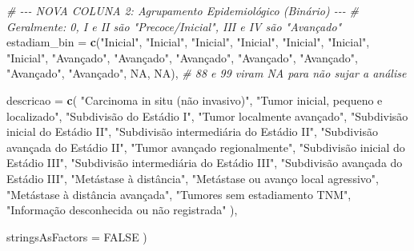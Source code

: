 \documentclass[
]{article}
\newenvironment{Shaded}{\begin{snugshade}}{\end{snugshade}}
\newcommand{\AttributeTok}[1]{\textcolor[rgb]{0.13,0.29,0.53}{#1}}
\newcommand{\CommentTok}[1]{\textcolor[rgb]{0.56,0.35,0.01}{\textit{#1}}}
\newcommand{\ConstantTok}[1]{\textcolor[rgb]{0.56,0.35,0.01}{#1}}
\newcommand{\FunctionTok}[1]{\textcolor[rgb]{0.13,0.29,0.53}{\textbf{#1}}}
\newcommand{\NormalTok}[1]{#1}
\newcommand{\StringTok}[1]{\textcolor[rgb]{0.31,0.60,0.02}{#1}}
\begin{document}
\begin{Shaded}
\begin{Highlighting}[]
  \CommentTok{\# {-}{-}{-} NOVA COLUNA 2: Agrupamento Epidemiológico (Binário) {-}{-}{-}}
  \CommentTok{\# Geralmente: 0, I e II são "Precoce/Inicial", III e IV são "Avançado"}
  \AttributeTok{estadiam\_bin =} \FunctionTok{c}\NormalTok{(}\StringTok{"Inicial"}\NormalTok{, }\StringTok{"Inicial"}\NormalTok{, }\StringTok{"Inicial"}\NormalTok{, }
                            \StringTok{"Inicial"}\NormalTok{, }\StringTok{"Inicial"}\NormalTok{, }\StringTok{"Inicial"}\NormalTok{, }\StringTok{"Inicial"}\NormalTok{, }
                            \StringTok{"Avançado"}\NormalTok{, }\StringTok{"Avançado"}\NormalTok{, }\StringTok{"Avançado"}\NormalTok{, }\StringTok{"Avançado"}\NormalTok{, }
                            \StringTok{"Avançado"}\NormalTok{, }\StringTok{"Avançado"}\NormalTok{, }\StringTok{"Avançado"}\NormalTok{, }
                            \ConstantTok{NA}\NormalTok{, }\ConstantTok{NA}\NormalTok{), }\CommentTok{\# 88 e 99 viram NA para não sujar a análise}
  
  \AttributeTok{descricao =} \FunctionTok{c}\NormalTok{(}
    \StringTok{"Carcinoma in situ (não invasivo)"}\NormalTok{,}
    \StringTok{"Tumor inicial, pequeno e localizado"}\NormalTok{,}
    \StringTok{"Subdivisão do Estádio I"}\NormalTok{,}
    \StringTok{"Tumor localmente avançado"}\NormalTok{,}
    \StringTok{"Subdivisão inicial do Estádio II"}\NormalTok{,}
    \StringTok{"Subdivisão intermediária do Estádio II"}\NormalTok{,}
    \StringTok{"Subdivisão avançada do Estádio II"}\NormalTok{,}
    \StringTok{"Tumor avançado regionalmente"}\NormalTok{,}
    \StringTok{"Subdivisão inicial do Estádio III"}\NormalTok{,}
    \StringTok{"Subdivisão intermediária do Estádio III"}\NormalTok{,}
    \StringTok{"Subdivisão avançada do Estádio III"}\NormalTok{,}
    \StringTok{"Metástase à distância"}\NormalTok{,}
    \StringTok{"Metástase ou avanço local agressivo"}\NormalTok{,}
    \StringTok{"Metástase à distância avançada"}\NormalTok{,}
    \StringTok{"Tumores sem estadiamento TNM"}\NormalTok{,}
    \StringTok{"Informação desconhecida ou não registrada"}
\NormalTok{  ),}
  
  \AttributeTok{stringsAsFactors =} \ConstantTok{FALSE}
\NormalTok{)}


\end{Highlighting}
\end{Shaded}
\end{document}
